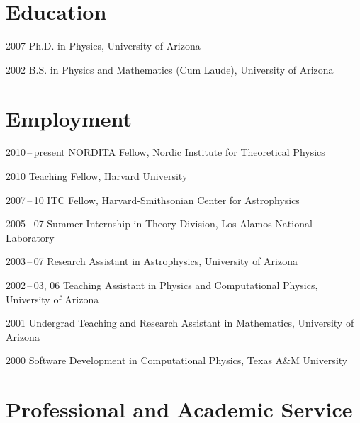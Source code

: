\section*{Education}

\begin{tlist}

\item[2007] Ph.D. in Physics, University of Arizona

\item[2002] B.S. in Physics and Mathematics (Cum Laude), University of Arizona

\end{tlist}

\section*{Employment}

\begin{tlist}

\item[2010\,--\,present] NORDITA Fellow, Nordic Institute for
  Theoretical Physics

\item[2010] Teaching Fellow, Harvard University

\item[2007\,--\,10] ITC Fellow, Harvard-Smithsonian Center for
  Astrophysics

\item[2005\,--\,07] Summer Internship in Theory Division, Los Alamos
  National Laboratory

\item[2003\,--\,07] Research Assistant in Astrophysics, University of
  Arizona

\item[2002\,--\,03, 06] Teaching Assistant in Physics and
  Computational Physics, University of Arizona

\item[2001] Undergrad Teaching and Research Assistant in Mathematics,
  University of Arizona

\item[2000] Software Development in Computational Physics, Texas A\&M
  University

\end{tlist}

\section*{Professional and Academic Service}

